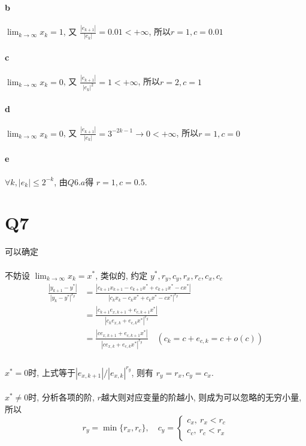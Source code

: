 \documentclass{article}
\begin{document}
\begin{CJK}{UTF8}{gbsn}
  \paragraph{b}
    $\lim_{k \to \infty} x_k = 1$, 又 $\frac{|e_{k + 1}|}{|e_k|} = 0.01 < +\infty$, 所以$r = 1, c = 0.01$
  \paragraph{c}
    $\lim_{k \to \infty} x_k = 0$, 又 $\frac{|e_{k + 1}|}{|e_k|^2} = 1 < +\infty$, 所以$r = 2, c = 1$
  \paragraph{d}
    $\lim_{k \to \infty} x_k = 0$, 又 $\frac{|e_{k + 1}|}{|e_k|} = 3^{-2k - 1} \to 0 < +\infty$, 所以$r = 1, c = 0$
  \paragraph{e}
    $\forall k, |e_k| \leq 2^{-k}$, 由$Q6.a$得 $r = 1, c = 0.5$.

\section{Q7}
  可以确定
  \paragraph{}
  不妨设 $\lim_{k \to \infty} x_k = x^*$, 类似的, 约定 $y^*, r_y, c_y, r_x, r_c, c_x, c_c$
  \begin{equation}
    \begin{aligned}
      \frac{|y_{k + 1} - y^*|}{|y_k - y^*|^{r_y}} & = \frac{|c_{k + 1}x_{k + 1} - c_{k + 1}x^* + c_{k + 1}x^* - cx^*|}{|c_{k}x_{k} - c_{k}x^* + c_{k}x^* - cx^*|^{r_y}} \\
      & = \frac{|c_{k + 1}e_{x, k + 1} + e_{c, k + 1}x^*|}{|c_{k}e_{x, k} + e_{c, k}x^*|^{r_y}} \\
      & = \frac{|ce_{x, k + 1} + e_{c, k + 1}x^*|}{|ce_{x, k} + e_{c, k}x^*|^{r_y}} \quad (c_k = c + e_{c, k} = c + o(c)) \\
    \end{aligned}
  \end{equation}
  \paragraph{}
    $x^* = 0$时, 上式等于$|e_{x, k + 1}| / |e_{x, k}|^{r_y}$, 则有 $r_y = r_x, c_y = c_x$.
  \paragraph{}
    $x^* \not= 0$时, 分析各项的阶, $r$越大则对应变量的阶越小, 则成为可以忽略的无穷小量, 所以
    \begin{equation}
      r_y = \min\{r_x, r_c\},\quad c_y =
      \begin{cases}
        c_x,\ r_x < r_c \\
        c_c,\ r_c < r_x \\
      \end{cases}
    \end{equation}

\end{CJK}
\end{document}
